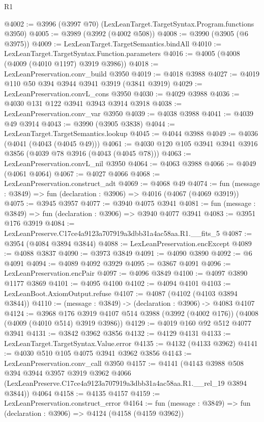 \begin{lexlean}{R1}
\begin{coremodule}
@4002 := @3996 (@3997 @70) (LexLeanTarget.TargetSyntax.Program.functions @3950)
@4005 := @3989 (@3992 (@4002 @508))
@4008 := @3990 (@3905 (@6 @3975))
@4009 := LexLeanTarget.TargetSemantics.bindAll
@4010 := LexLeanTarget.TargetSyntax.Function.parameters
@4016 := @4005 (@4008 (@4009 (@4010 @1197) @3919 @3986))
@4018 := LexLeanPreservation.conv_build @3950
@4019 := @4018 @3988
@4027 := @4019 @110 @50 @394 @3944 @3941 @3919 (@3841 @3919)
@4029 := LexLeanPreservation.convL_cons @3950
@4030 := @4029 @3988
@4036 := @4030 @131 @122 @3941 @3943 @3914 @3918
@4038 := LexLeanPreservation.conv_var @3950
@4039 := @4038 @3988
@4041 := @4039 @49 @3914
@4043 := @3990 (@3905 @3838)
@4044 := LexLeanTarget.TargetSemantics.lookup
@4045 := @4044 @3988
@4049 := @4036 (@4041 (@4043 (@4045 @49)))
@4061 := @4030 @120 @105 @3941 @3941 @3916 @3856 (@4039 @78 @3916 (@4043 (@4045 @78)))
@4063 := LexLeanPreservation.convL_nil @3950
@4064 := @4063 @3988
@4066 := @4049 (@4061 @4064)
@4067 := @4027 @4066
@4068 := LexLeanPreservation.construct_adt
@4069 := @4068 @49
@4074 := fun (message : @3849) => fun (declaration : @3906) => @4016 (@4067 (@4069 @3919))
@4075 := @3945 @3957
@4077 := @3940 @4075 @3941
@4081 := fun (message : @3849) => fun (declaration : @3906) => @3940 @4077 @3941
@4083 := @3951 @176 @3919
@4084 := LexLeanPreserve.C17ce4a9123a707919a3dbb31a4ac58aa.R1.__fits_5
@4087 := @3954 (@4084 @3894 @3844)
@4088 := LexLeanPreservation.encExcept
@4089 := @4088 @3837
@4090 := @3973 @3849
@4091 := @4090 @3890
@4092 := @6 @4091
@4094 := @4089 @4092 @3929
@4095 := @3867 @4091
@4096 := LexLeanPreservation.encPair
@4097 := @4096 @3849
@4100 := @4097 @3890 @1177 @3869
@4101 := @4095 @4100
@4102 := @4094 @4101
@4103 := LexLeanBoot.AxiomOutput.refuse
@4107 := @4087 (@4102 (@4103 @3894 @3844))
@4110 := (message : @3849) -> (declaration : @3906) -> @4083 @4107
@4124 := @3968
    @176
    @3919
    @4107
    @514
    @3988
    (@3992 (@4002 @176))
    (@4008 (@4009 (@4010 @514) @3919 @3986))
@4129 := @4019 @160 @92 @512 @4077 @3941
@4131 := @3842 @3962 @3856
@4132 := @4129 @4131
@4133 := LexLeanTarget.TargetSyntax.Value.error
@4135 := @4132 (@4133 @3962)
@4141 := @4030 @510 @105 @4075 @3941 @3962 @3856
@4143 := LexLeanPreservation.conv_call @3950
@4157 := @4141
    (@4143
      @3988
      @508
      @394
      @3944
      @3957
      @3919
      @3962
      @4066
      (LexLeanPreserve.C17ce4a9123a707919a3dbb31a4ac58aa.R1.__rel_19 @3894 @3844))
    @4064
@4158 := @4135 @4157
@4159 := LexLeanPreservation.construct_error
@4164 := fun (message : @3849) => fun (declaration : @3906) => @4124 (@4158 (@4159 @3962))

\end{coremodule}
\end{lexlean}
